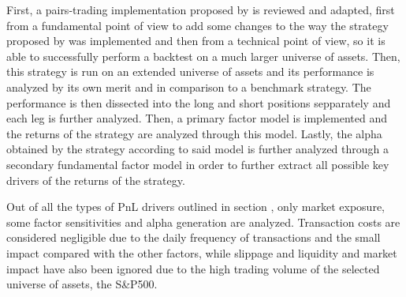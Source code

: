 First, a pairs-trading implementation proposed by \cite{gallego_2023} is reviewed and adapted, first from a fundamental point of view to add some changes to the way the strategy proposed by \cite{ioannis_2023} was implemented and then from a technical point of view, so it is able to successfully perform a backtest on a much larger universe of assets. Then, this strategy is run on an extended universe of assets and its performance is analyzed by its own merit and in comparison to a benchmark strategy. The performance is then dissected into the long and short positions sepparately and each leg is further analyzed. 
Then, a primary factor model is implemented and the returns of the strategy are analyzed through this model.  
Lastly, the alpha obtained by the strategy according to said model is further analyzed through a secondary fundamental factor model in order to further extract all possible key drivers of the returns of the strategy. 

Out of all the types of PnL drivers outlined in section , only market exposure, some factor sensitivities and alpha generation are analyzed. Transaction costs are considered negligible due to the daily frequency of transactions and the small impact compared with the other factors, while slippage and liquidity and market impact have also been ignored due to the high trading volume of the selected universe of assets, the S\&P500. 
